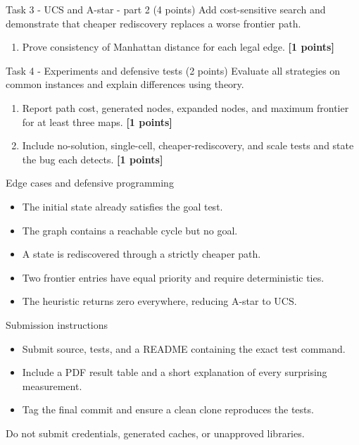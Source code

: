 \documentclass[aspectratio=169,11pt]{beamer}
\begin{document}
\begin{frame}{Task 3 - UCS and A-star - part 2 (4 points)}
\small
Add cost-sensitive search and demonstrate that cheaper rediscovery replaces a worse frontier path.

\vspace{0.2cm}
\begin{enumerate}
\item[\textbf{d.}] Prove consistency of Manhattan distance for each legal edge. \hfill{\color{courseblue}\textbf{[1 points]}}
\end{enumerate}
\end{frame}

\begin{frame}{Task 4 - Experiments and defensive tests (2 points)}
\small
Evaluate all strategies on common instances and explain differences using theory.

\vspace{0.2cm}
\begin{enumerate}
\item[\textbf{a.}] Report path cost, generated nodes, expanded nodes, and maximum frontier for at least three maps. \hfill{\color{courseblue}\textbf{[1 points]}}
\item[\textbf{b.}] Include no-solution, single-cell, cheaper-rediscovery, and scale tests and state the bug each detects. \hfill{\color{courseblue}\textbf{[1 points]}}
\end{enumerate}
\end{frame}

\begin{frame}{Edge cases and defensive programming}
\small
\begin{itemize}
  \item The initial state already satisfies the goal test.
  \item The graph contains a reachable cycle but no goal.
  \item A state is rediscovered through a strictly cheaper path.
  \item Two frontier entries have equal priority and require deterministic ties.
  \item The heuristic returns zero everywhere, reducing A-star to UCS.
\end{itemize}
\end{frame}

\begin{frame}{Submission instructions}
\small
\begin{itemize}
  \item Submit source, tests, and a README containing the exact test command.
  \item Include a PDF result table and a short explanation of every surprising measurement.
  \item Tag the final commit and ensure a clean clone reproduces the tests.
\end{itemize}
\vspace{0.2cm}
\alert{Do not submit credentials, generated caches, or unapproved libraries.}
\end{frame}
\end{document}
